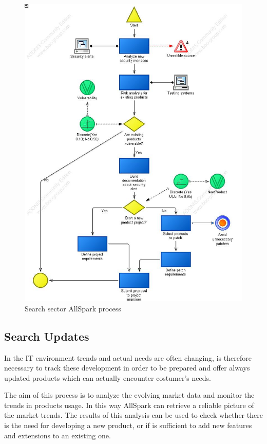 \begin{figure}
\begin{centering}
\includegraphics[scale=0.50]{assign2/adonis/imgs/sector.jpg}
\caption{Search sector AllSpark process}
\label{2img:sector}
\end{centering}
\end{figure}


\subsection{Search Updates}
In the IT environment trends and actual needs are often changing, is
therefore necessary to track these development in order to be prepared and
offer always updated products which can actually encounter costumer's
needs.

The aim of this process is to analyze the evolving market data and monitor
the trends in products usage. In this way AllSpark can retrieve a reliable
picture of the market trends.
The results of this analysis can be used to check whether there is the need
for developing a new product, or if is sufficient to add new features and
extensions to an existing one. 
